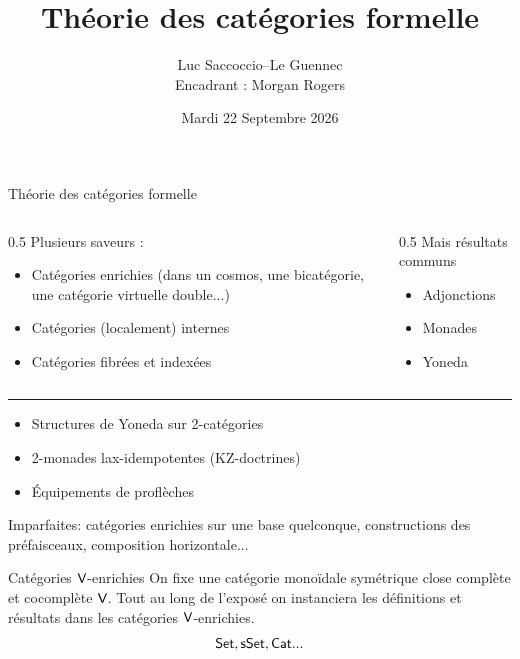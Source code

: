 \documentclass[9pt]{beamer}
\title{Théorie des catégories formelle}
\author{Luc Saccoccio--Le Guennec\\[1ex] {\small Encadrant : Morgan Rogers}}
\date{Mardi 22 Septembre 2026}
\newcommand{\cat}[1]{\textcat{#1}}
\newcommand{\textcat}[1]{{\normalfont\textsf{#1}}}
\begin{document}
\frame{\titlepage}

\begin{frame}{Théorie des catégories formelle}
    \begin{columns}[T]
        \begin{column}{0.5\textwidth}
        Plusieurs saveurs :
        \begin{itemize}
            \item Catégories enrichies (dans un cosmos, une bicatégorie, une catégorie virtuelle double...)
            \item Catégories (localement) internes
            \item Catégories fibrées et indexées
        \end{itemize}
        \end{column}
        \vrule{}
        \begin{column}{0.5\textwidth}
        Mais résultats communs
        \begin{itemize}
            \item Adjonctions
            \item Monades
            \item Yoneda
        \end{itemize}
        \end{column}
    \end{columns}
    \vspace{\baselineskip}
    \hrule
    \vspace{\baselineskip}
    \begin{itemize}
        \item Structures de Yoneda sur 2-catégories
        \item 2-monades lax-idempotentes (KZ-doctrines)
        \item Équipements de proflèches
    \end{itemize}
    Imparfaites: catégories enrichies sur une base quelconque, constructions des préfaisceaux, composition horizontale...
\end{frame}

\begin{frame}{Catégories $\cat V$-enrichies}
    On fixe une catégorie monoïdale symétrique close complète et cocomplète $\cat V$. Tout au long de l'exposé on instanciera les définitions et résultats dans les catégories $\cat V$-enrichies.
    \vspace{\baselineskip}
    \[\cat{Set}, \cat{sSet}, \cat{Cat}...\]
\end{frame}
\end{document}
